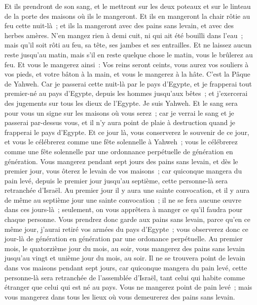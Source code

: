 \begin{multicols}{2}
 Et ils prendront de son sang, et le mettront sur les deux poteaux et sur le linteau de la porte des maisons où ils le mangeront.
 Et ils en mangeront la chair rôtie au feu cette nuit-là~; et ils la mangeront avec des pains sans levain, et avec des herbes amères.
N'en mangez rien à demi cuit, ni qui ait été bouilli dans l'eau~; mais qu'il soit rôti au feu, sa tête, ses jambes et ses entrailles.
 Et ne laissez aucun reste jusqu'au matin, mais s'il en reste quelque chose le matin, vous le brûlerez au feu.
Et vous le mangerez ainsi~: Vos reins seront ceints, vous aurez vos souliers à vos pieds, et votre bâton à la main, et vous le mangerez à la hâte. C'est la Pâque de Yahweh.
Car je passerai cette nuit-là par le pays d'Egypte, et je frapperai tout premier-né au pays d'Egypte, depuis les hommes jusqu'aux bêtes~; et j'exercerai des jugements sur tous les dieux de l'Egypte. Je suis Yahweh.
Et le sang sera pour vous un signe sur les maisons où vous serez~; car je verrai le sang et je passerai par-dessus vous, et il n'y aura point de plaie à destruction quand je frapperai le pays d'Egypte.
Et ce jour là, vous conserverez le souvenir de ce jour, et vous le célébrerez comme une fête solennelle à Yahweh~; vous le célébrerez comme une fête solennelle par une ordonnance perpétuelle de génération en génération.
Vous mangerez pendant sept jours des pains sans levain, et dès le premier jour, vous ôterez le levain de vos maisons~; car quiconque mangera du pain levé, depuis le premier jour jusqu'au septième, cette personne-là sera retranchée d'Israël.
Au premier jour il y aura une sainte convocation, et il y aura de même au septième jour une sainte convocation~; il ne se fera aucune œuvre dans ces jours-là~; seulement, on vous apprêtera à manger ce qu'il faudra pour chaque personne.
Vous prendrez donc garde aux pains sans levain, parce qu'en ce même jour, j'aurai retiré vos armées du pays d'Egypte~; vous observerez donc ce jour-là de génération en génération par une ordonance perpétuelle.
Au premier mois, le quatorzième jour du mois, au soir, vous mangerez des pains sans levain jusqu'au vingt et unième jour du mois, au soir.
Il ne se trouvera point de levain dans vos maisons pendant sept jours, car quiconque mangera du pain levé, cette personne-là sera retranchée de l'assemblée d'Israël, tant celui qui habite comme étranger que celui qui est né au pays.
Vous ne mangerez point de pain levé~; mais vous mangerez dans tous les lieux où vous demeurerez des pains sans levain.

\end{multicols}
